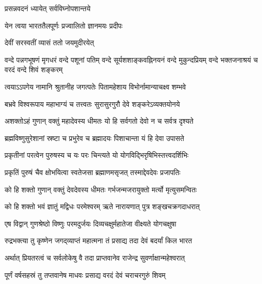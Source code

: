 \label{sec:start_ShivaSahasranamaStotram}

{प्रसन्नवदनं ध्यायेत् सर्वविघ्नोपशान्तये}

{येन त्वया भारततैलपूर्णः प्रज्वालितो ज्ञानमयः प्रदीपः}


{देवीं सरस्वतीं व्यासं ततो जयमुदीरयेत्}


{वन्दे पन्नगभूषणं मृगधरं वन्दे पशूनां पतिम्}
{वन्दे सूर्यशशाङ्कवह्निनयनं वन्दे मुकुन्दप्रियम्}
{वन्दे भक्तजनाश्रयं च वरदं वन्दे शिवं शङ्करम्}


\twolineshloka
{त्वयाऽऽपगेय नामानि श्रुतानीह जगत्पतेः}
{पितामहेशाय विभोर्नामान्याचक्ष्व शम्भवे}%

\twolineshloka
{बभ्रवे विश्वरूपाय महाभाग्यं च तत्त्वतः}
{सुरासुरगुरौ देवे शङ्करेऽव्यक्तयोनये}%

\twolineshloka
{अशक्तोऽहं गुणान् वक्तुं महादेवस्य धीमतः}
{यो हि सर्वगतो देवो न च सर्वत्र दृश्यते}%

\twolineshloka
{ब्रह्मविष्णुसुरेशानां स्रष्टा च प्रभुरेव च}
{ब्रह्मादयः पिशाचान्ता यं हि देवा उपासते}%

\twolineshloka
{प्रकृतीनां परत्वेन पुरुषस्य च यः परः}
{चिन्त्यते यो योगविद्भिरृषिभिस्तत्त्वदर्शिभिः}%

\twolineshloka
{प्रकृतिं पुरुषं चैव क्षोभयित्वा स्वतेजसा}
{ब्रह्माणमसृजत् तस्माद्देवदेवः प्रजापतिः}%


\twolineshloka
{को हि शक्तो गुणान् वक्तुं देवदेवस्य धीमतः}
{गर्भजन्मजरायुक्तो मर्त्यो मृत्युसमन्वितः}%

\twolineshloka
{को हि शक्तो भवं ज्ञातुं मद्विधः परमेश्वरम्}
{ऋते नारायणात् पुत्र शङ्खचक्रगदाधरात्}%

\twolineshloka
{एष विद्वान् गुणश्रेष्ठो विष्णुः परमदुर्जयः}
{दिव्यचक्षुर्महातेजा वीक्ष्यते योगचक्षुषा}%

\twolineshloka
{रुद्रभक्त्या तु कृष्णेन जगद्‌व्याप्तं महात्मना}
{तं प्रसाद्य तदा देवं बदर्यां किल भारत}%

\twolineshloka
{अर्थात् प्रियतरत्वं च सर्वलोकेषु वै तदा}
{प्राप्तवानेव राजेन्द्र सुवर्णाक्षान्महेश्वरात्}%

\twolineshloka
{पूर्णं वर्षसहस्रं तु तप्तवानेष माधवः}
{प्रसाद्य वरदं देवं चराचरगुरुं शिवम्}%

